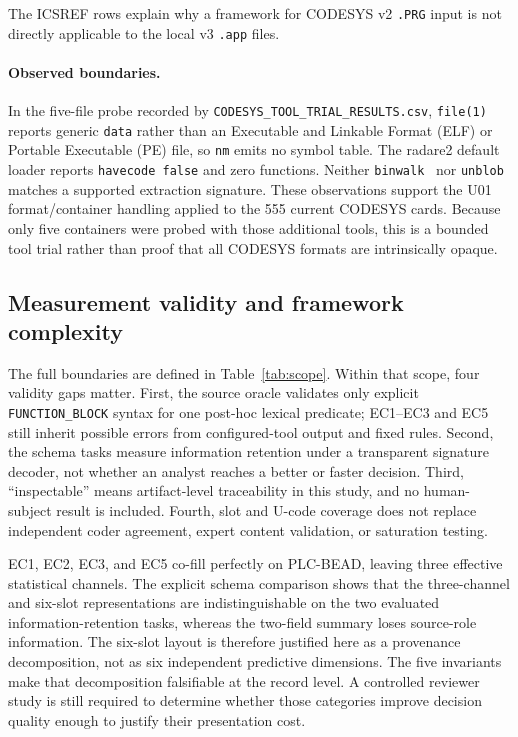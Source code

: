 \documentclass[manuscript,screen,review]{acmart}
\begin{document}
The ICSREF rows explain why a framework for CODESYS v2 \texttt{.PRG} input is not directly applicable to the local v3 \texttt{.app} files.

\paragraph{Observed boundaries.} In the five-file probe recorded by \texttt{CODESYS\_TOOL\_TRIAL\_RESULTS.csv}, \texttt{file(1)} reports generic \texttt{data} rather than an Executable and Linkable Format (ELF) or Portable Executable (PE) file, so \texttt{nm} emits no symbol table. The radare2 default loader reports \texttt{havecode false} and zero functions. Neither \texttt{binwalk}~\cite{binwalk} nor \texttt{unblob}~\cite{unblob} matches a supported extraction signature. These observations support the U01 format/container handling applied to the 555 current CODESYS cards. Because only five containers were probed with those additional tools, this is a bounded tool trial rather than proof that all CODESYS formats are intrinsically opaque.

\subsection{Measurement validity and framework complexity}

The full boundaries are defined in Table~\ref{tab:scope}. Within that scope, four validity gaps matter. First, the source oracle validates only explicit \texttt{FUNCTION\_BLOCK} syntax for one post-hoc lexical predicate; EC1--EC3 and EC5 still inherit possible errors from configured-tool output and fixed rules. Second, the schema tasks measure information retention under a transparent signature decoder, not whether an analyst reaches a better or faster decision. Third, ``inspectable'' means artifact-level traceability in this study, and no human-subject result is included. Fourth, slot and U-code coverage does not replace independent coder agreement, expert content validation, or saturation testing.

EC1, EC2, EC3, and EC5 co-fill perfectly on PLC-BEAD, leaving three effective statistical channels. The explicit schema comparison shows that the three-channel and six-slot representations are indistinguishable on the two evaluated information-retention tasks, whereas the two-field summary loses source-role information. The six-slot layout is therefore justified here as a provenance decomposition, not as six independent predictive dimensions. The five invariants make that decomposition falsifiable at the record level. A controlled reviewer study is still required to determine whether those categories improve decision quality enough to justify their presentation cost.
\end{document}
